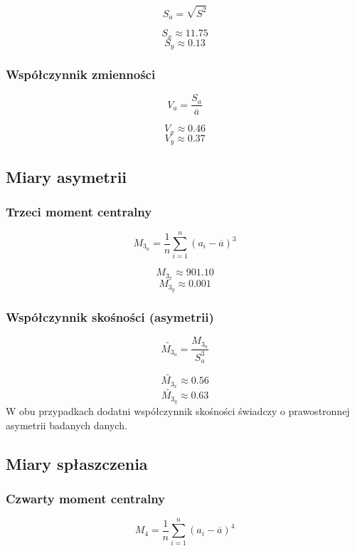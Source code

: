\documentclass[fleqn]{article}
\begin{document}
    $$S_a = \sqrt{S^2}$$ 
    

    $$S_{x} \approx 11.75$$
    $$S_{y} \approx 0.13$$

    \subsubsection{Współczynnik zmienności}

    $$V_a = \frac{S_a}{\overline{a}}$$

    $$V_{x} \approx 0.46$$
    $$V_{y} \approx 0.37$$

    \subsection{Miary asymetrii}

    \subsubsection{Trzeci moment centralny}

    $$M_{3_a} = \frac{1}{n} \sum_{i=1}^n\left(a_i - \overline{a}\right)^3$$ 
    

    $$M_{3_{x}} \approx 901.10$$
    $$M_{3_{y}} \approx 0.001$$

    \subsubsection{Współczynnik skośności (asymetrii)}

    $$\widetilde{M_{3_a}} = \frac{M_{3_a}}{S_a^3}$$ 
    

    $$\widetilde{M_{3_{x}}} \approx 0.56$$
    $$\widetilde{M_{3_{y}}} \approx 0.63$$
	W obu przypadkach dodatni współczynnik skośności świadczy o prawostronnej asymetrii badanych danych.

    \subsection{Miary spłaszczenia}

    \subsubsection{Czwarty moment centralny}

    $$M_4 = \frac{1}{n} \sum_{i=1}^n\left(a_i - \overline{a}\right)^4$$ 
    
\end{document}
